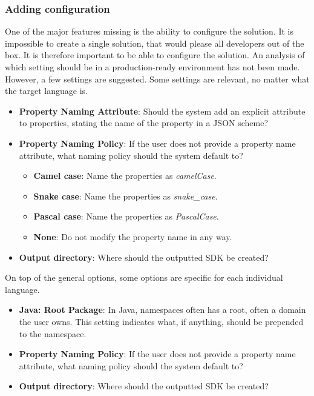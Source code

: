 \subsubsection*{Adding configuration}
One of the major features missing is the ability to configure the solution.
It is impossible to create a single solution, that would please all developers out of the box. It is therefore important to be able to configure the solution.
An analysis of which setting should be in a production-ready environment has not been made. However, a few settings are suggested.
Some settings are relevant, no matter what the target language is.
\begin{itemize}
    \item \textbf{Property Naming Attribute}: Should the system add an explicit attribute to properties, stating the name of the property in a JSON scheme? 
    \item \textbf{Property Naming Policy}: If the user does not provide a property name attribute, what naming policy should the system default to? 
    \begin{itemize}
        \item \textbf{Camel case}: Name the properties as \textit{camelCase}.
        \item \textbf{Snake case}: Name the properties as \textit{snake\_case}.
        \item \textbf{Pascal case}: Name the properties as \textit{PascalCase}.
        \item \textbf{None}: Do not modify the property name in any way.
    \end{itemize}
    \item \textbf{Output directory}: Where should the outputted SDK be created?
\end{itemize}
\noindent
On top of the general options, some options are specific for each individual language.
\begin{itemize}
    \item \textbf{Java: Root Package}: In Java, namespaces often has a root, often a domain the user owns. This setting indicates what, if anything, should be prepended to the namespace.
    \item \textbf{Property Naming Policy}: If the user does not provide a property name attribute, what naming policy should the system default to? 
    \item \textbf{Output directory}: Where should the outputted SDK be created?
    
\end{itemize}


